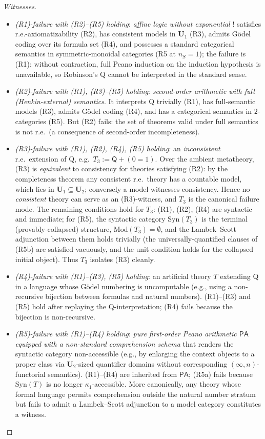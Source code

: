 \documentclass[11pt]{article}
\theoremstyle{plain}
\theoremstyle{definition}
\newcommand{\Syn}{\mathrm{Syn}}
\newcommand{\Mod}{\mathrm{Mod}}
\begin{document}
\begin{proof}[Witnesses]
\begin{itemize}[nosep]
\item \emph{(R1)-failure with (R2)--(R5) holding}: \emph{affine logic without exponential $!$} satisfies r.e.-axiomatizability (R2), has consistent models in $\mathbf{U}_1$ (R3), admits G\"odel coding over its formula set (R4), and possesses a standard categorical semantics in symmetric-monoidal categories (R5 at $n_S = 1$); the failure is (R1): without contraction, full Peano induction on the induction hypothesis is unavailable, so Robinson's Q cannot be interpreted in the standard sense.
\item \emph{(R2)-failure with (R1), (R3)--(R5) holding}: \emph{second-order arithmetic with full (Henkin-external) semantics}. It interprets Q trivially (R1), has full-semantic models (R3), admits G\"odel coding (R4), and has a categorical semantics in $2$-categories (R5). But (R2) fails: the set of theorems valid under full semantics is not r.e.\ (a consequence of second-order incompleteness).
\item \emph{(R3)-failure with (R1), (R2), (R4), (R5) holding}: an \emph{inconsistent} r.e.\ extension of Q, e.g.\ $T_3 := \mathsf{Q} + (0 = 1)$. Over the ambient metatheory, (R3) is \emph{equivalent} to consistency for theories satisfying (R2): by the completeness theorem any consistent r.e.\ theory has a countable model, which lies in $\mathbf{U}_1 \subseteq \mathbf{U}_2$; conversely a model witnesses consistency. Hence no \emph{consistent} theory can serve as an (R3)-witness, and $T_3$ is the canonical failure mode. The remaining conditions hold for $T_3$: (R1), (R2), (R4) are syntactic and immediate; for (R5), the syntactic category $\Syn(T_3)$ is the terminal (provably-collapsed) structure, $\Mod(T_3) = \emptyset$, and the Lambek--Scott adjunction between them holds trivially (the universally-quantified clauses of (R5b) are satisfied vacuously, and the unit condition holds for the collapsed initial object). Thus $T_3$ isolates (R3) cleanly.
\item \emph{(R4)-failure with (R1)--(R3), (R5) holding}: an artificial theory $T$ extending Q in a language whose G\"odel numbering is uncomputable (e.g., using a non-recursive bijection between formulas and natural numbers). (R1)--(R3) and (R5) hold after replaying the Q-interpretation; (R4) fails because the bijection is non-recursive.
\item \emph{(R5)-failure with (R1)--(R4) holding}: \emph{pure first-order Peano arithmetic $\mathsf{PA}$ equipped with a non-standard comprehension schema} that renders the syntactic category non-accessible (e.g., by enlarging the context objects to a proper class via $\mathbf{U}_2$-sized quantifier domains without corresponding $(\infty, n)$-functorial semantics). (R1)--(R4) are inherited from $\mathsf{PA}$; (R5a) fails because $\Syn(T)$ is no longer $\kappa_1$-accessible. More canonically, any theory whose formal language permits comprehension outside the natural number stratum but fails to admit a Lambek--Scott adjunction to a model category constitutes a witness.
\end{itemize}
\end{proof}
\end{document}
